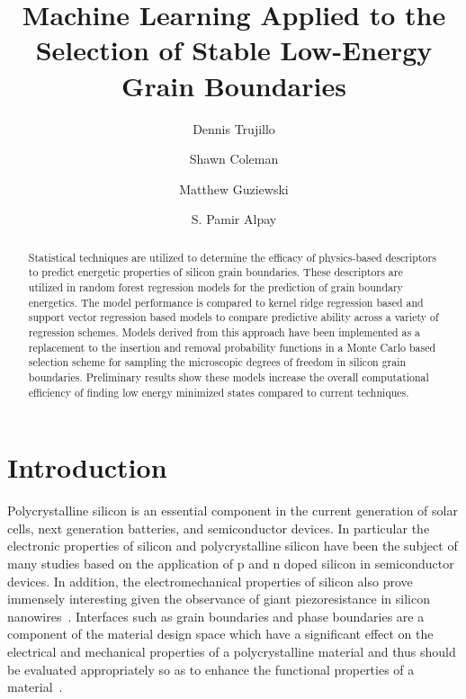 \documentclass[aip,reprint,longbibliography,amsmath,amssymb,twocolumn,superscriptaddress]{revtex4-1}
\begin{document}
\title{Machine Learning Applied to the Selection of Stable Low-Energy Grain Boundaries}
\author{Dennis Trujillo}
\author{Shawn Coleman}
\author{Matthew Guziewski}
\author{S. Pamir Alpay}



\begin{abstract}
Statistical techniques are utilized to determine the efficacy of physics-based descriptors to predict energetic properties of silicon grain boundaries. 
%
These descriptors are utilized in random forest regression models for the prediction of grain boundary energetics. 
%
The model performance is compared to kernel ridge regression based and support vector regression based models to compare predictive ability across a variety of regression schemes. 
%
Models derived from this approach have been implemented as a replacement to the insertion and removal probability functions in a Monte Carlo based selection scheme for sampling the microscopic degrees of freedom in silicon grain boundaries.  
%
Preliminary results show these models increase the overall computational efficiency of finding low energy minimized states compared to current techniques. 
\end{abstract}

\maketitle 

\section{Introduction}
Polycrystalline silicon is an essential component in the current generation of solar cells, next generation batteries, and semiconductor devices. 
%
In particular the electronic properties of silicon and polycrystalline silicon have been the subject of many studies based on the application of p and n doped silicon in semiconductor devices.
%
In addition, the electromechanical properties of silicon also prove immensely interesting given the observance of giant piezoresistance in silicon nanowires~\cite{He2006}. 
%
Interfaces such as grain boundaries and phase boundaries are a component of the material design space which have a significant effect on the electrical and mechanical properties of a polycrystalline material and thus should be evaluated appropriately so as to enhance the functional properties of a material~\cite{Zhang2013}. 
\end{document}
